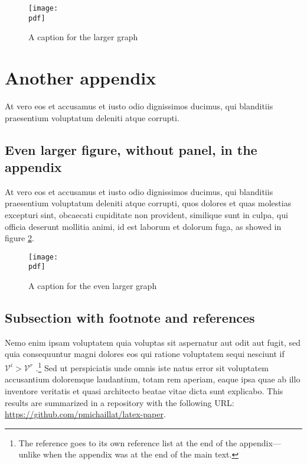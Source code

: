 \documentclass[letterpaper,12pt,leqno]{article}
\newcommand{\bib}{bibliography.bib}
\newcommand{\pdf}{figures.pdf}
\begin{document}
\begin{figure}[t]
\texttt{[image: \\pdf]}
\caption{A caption for the larger graph}
\label{f:appendix1}\end{figure}

\section{Another appendix}\label{a:appendix2}

At vero eos et accusamus et iusto odio dignissimos ducimus, qui blanditiis praesentium voluptatum deleniti atque corrupti.

\subsection{Even larger figure, without panel, in the appendix} 

At vero eos et accusamus et iusto odio dignissimos ducimus, qui blanditiis praesentium voluptatum deleniti atque corrupti, quos dolores et quas molestias excepturi sint, obcaecati cupiditate non provident, similique sunt in culpa, qui officia deserunt mollitia animi, id est laborum et dolorum fuga, as showed in figure \ref{f:appendix2}.

\begin{figure}[t]
\texttt{[image: \\pdf]}
\caption{A caption for the even larger graph}
\label{f:appendix2}\end{figure}


\subsection{Subsection with footnote and references}\label{a:subappendix}

Nemo enim ipsam voluptatem quia voluptas sit aspernatur aut odit aut fugit, sed quia consequuntur magni dolores eos qui ratione voluptatem sequi nesciunt if $\mathcal{V}^i > \mathcal{V}^r$ \citep{MS21b}.\footnote{The reference goes to its own reference list at the end of the appendix---unlike when the appendix was at the end of the main text.} Sed ut perspiciatis unde omnis iste natus error sit voluptatem accusantium doloremque laudantium, totam rem aperiam, eaque ipsa quae ab illo inventore veritatis et quasi architecto beatae vitae dicta sunt explicabo. This results are summarized in a repository with the following URL: \url{https://github.com/pmichaillat/latex-paper}.


\end{document}
